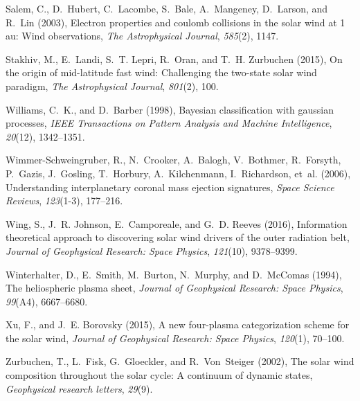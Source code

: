 \documentclass[draft,jgrga]{agutex}
\begin{document}
\begin{article}
\begin{thebibliography}{27}
Salem, C., D.~Hubert, C.~Lacombe, S.~Bale, A.~Mangeney, D.~Larson, and R.~Lin
  (2003), Electron properties and coulomb collisions in the solar wind at 1 au:
  Wind observations, \textit{The Astrophysical Journal}, \textit{585}(2), 1147.

Stakhiv, M., E.~Landi, S.~T. Lepri, R.~Oran, and T.~H. Zurbuchen (2015), On the
  origin of mid-latitude fast wind: Challenging the two-state solar wind
  paradigm, \textit{The Astrophysical Journal}, \textit{801}(2), 100.

Williams, C.~K., and D.~Barber (1998), Bayesian classification with gaussian
  processes, \textit{IEEE Transactions on Pattern Analysis and Machine
  Intelligence}, \textit{20}(12), 1342--1351.

Wimmer-Schweingruber, R., N.~Crooker, A.~Balogh, V.~Bothmer, R.~Forsyth,
  P.~Gazis, J.~Gosling, T.~Horbury, A.~Kilchenmann, I.~Richardson, et~al.
  (2006), Understanding interplanetary coronal mass ejection signatures,
  \textit{Space Science Reviews}, \textit{123}(1-3), 177--216.

Wing, S., J.~R. Johnson, E.~Camporeale, and G.~D. Reeves (2016), Information
  theoretical approach to discovering solar wind drivers of the outer radiation
  belt, \textit{Journal of Geophysical Research: Space Physics},
  \textit{121}(10), 9378--9399.

Winterhalter, D., E.~Smith, M.~Burton, N.~Murphy, and D.~McComas (1994), The
  heliospheric plasma sheet, \textit{Journal of Geophysical Research: Space
  Physics}, \textit{99}(A4), 6667--6680.

Xu, F., and J.~E. Borovsky (2015), A new four-plasma categorization scheme for
  the solar wind, \textit{Journal of Geophysical Research: Space Physics},
  \textit{120}(1), 70--100.

Zurbuchen, T., L.~Fisk, G.~Gloeckler, and R.~Von~Steiger (2002), The solar wind
  composition throughout the solar cycle: A continuum of dynamic states,
  \textit{Geophysical research letters}, \textit{29}(9).


\end{thebibliography}
\end{article}
\end{document}
